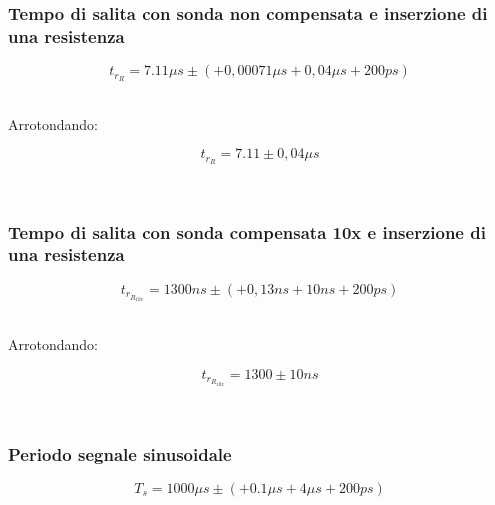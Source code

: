 \documentclass[a4paper]{article}
\begin{document}
\subsubsection{Tempo di salita con sonda non compensata e inserzione di una resistenza}

\begin{Large}
	\begin{equation}
		t_{r_R}= 7.11\mu s \pm( + 0,00071\mu s + 0,04\mu s + 200ps)
	\end{equation}
\end{Large}\\

Arrotondando: 

\begin{Large}
	\begin{equation}
		t_{r_R}= 7.11\pm 0,04 \mu s
	\end{equation}
\end{Large}\\

\subsubsection{Tempo di salita con sonda compensata 10x e inserzione di una resistenza}

\begin{Large}
	\begin{equation}
		{t_{r_{R_{10x}}}}= 1300ns \pm ( + 0,13ns + 10ns + 200ps)
	\end{equation}
\end{Large}\\

Arrotondando: 

\begin{Large}
	\begin{equation}
		{t_{r_{R_{10x}}}}= 1300\pm 10 ns
	\end{equation}
\end{Large}\\

\subsubsection{Periodo segnale sinusoidale}
\begin{Large}
	\begin{equation}
  		{T_s}= 1000\mu s\pm (+ 0.1 \mu s + 4 \mu s + 200ps)
	\end{equation}
\end{Large}\\
\\
\\
\\
\end{document}
